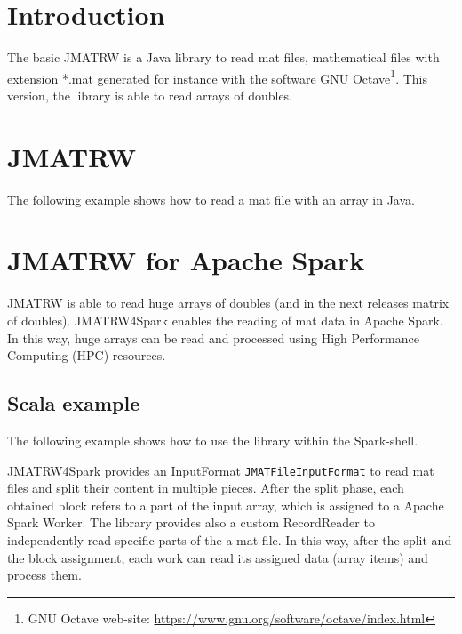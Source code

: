 \documentclass[
10pt, %
a4paper, %
oneside, %
headinclude,footinclude, %
BCOR5mm, %
]{scrartcl}
\begin{document}



\section{Introduction}

The basic JMATRW is a Java library to read mat files, mathematical files with extension *.mat generated for instance with the software GNU Octave\footnote{GNU Octave web-site: \url{https://www.gnu.org/software/octave/index.html}}. This version, the library is able to read arrays of doubles. 
  
\section{JMATRW}

The following example shows how to read a mat file with an array in Java.



\section{JMATRW for Apache Spark}

JMATRW is able to read huge arrays of doubles (and in the next releases matrix of doubles). JMATRW4Spark enables the reading of mat data in Apache Spark. In this way, huge arrays can be read and processed using High Performance Computing (HPC) resources.

\subsection{Scala example}

The following example shows how to use the library within the Spark-shell.



JMATRW4Spark provides an InputFormat \verb|JMATFileInputFormat| to read mat files and split their content in multiple pieces. After the split phase, each obtained block refers to a part of the input array, which is assigned to a Apache Spark Worker. The library provides also a custom RecordReader to independently read specific parts of the a mat file. In this way, after the split and the block assignment, each work can read its assigned data (array items) and process them.
\end{document}
